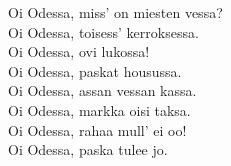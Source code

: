 
Oi Odessa, miss' on miesten vessa? \\ Oi Odessa, toisess' kerroksessa. \\ Oi Odessa, ovi lukossa! \\ Oi Odessa, paskat housussa. \\ Oi Odessa, assan vessan kassa. \\ Oi Odessa, markka oisi taksa. \\ Oi Odessa, rahaa mull' ei oo! \\ Oi Odessa, paska tulee jo.